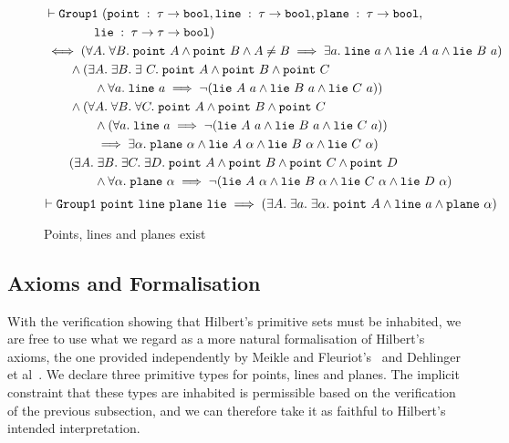 \begin{figure}
  \begin{align*}
    &\vdash\code{Group1}\ (\code{point}\;:\;\tau\rightarrow\code{bool}, \code{line}\;:\;\tau\rightarrow\code{bool},\code{plane}\;:\;\tau\rightarrow\code{bool},\\
    &\qquad\qquad\code{lie}\;:\;\tau\rightarrow\tau\rightarrow\code{bool})\\
    &\iff (\forall A.\;\forall B.\; \code{point}\ A \wedge \code{point}\ B \wedge A \neq B \implies \exists a.\; \code{line}\ a \wedge \code{lie}\ A\ a \wedge \code{lie}\ B\ a)\\
    &\qquad\wedge (\exists A.\;\exists B.\;\exists\ C.\; \code{point}\ A \wedge \code{point}\ B \wedge \code{point}\ C\\
    &\qquad\qquad\wedge \forall a.\; \code{line}\ a \implies \neg(\code{lie}\ A\ a \wedge \code{lie}\ B\ a \wedge \code{lie}\ C\ a))\\
    &\qquad\wedge(\forall A.\;\forall B.\;\forall C.\; \code{point}\ A \wedge \code{point}\ B \wedge \code{point}\ C\\
    &\qquad\qquad\wedge (\forall a.\; \code{line}\ a \implies \neg(\code{lie}\ A\ a \wedge \code{lie}\ B\ a \wedge \code{lie}\ C\ a))\\
    &\qquad\qquad\implies\exists\alpha.\; \code{plane}\ \alpha \wedge \code{lie}\ A\ \alpha \wedge \code{lie}\ B\ \alpha \wedge \code{lie}\ C\ \alpha)\\
    &\qquad (\exists A.\;\exists B.\;\exists C.\;\exists D.\; \code{point}\ A \wedge \code{point}\ B \wedge \code{point}\ C \wedge \code{point}\ D\\
    &\qquad\qquad \wedge \forall \alpha.\; \code{plane}\ \alpha \implies \neg(\code{lie}\ A\ \alpha \wedge \code{lie}\ B\ \alpha \wedge \code{lie}\ C\ \alpha \wedge \code{lie}\ D\ \alpha)\\
  \end{align*}
  \begin{displaymath}
    \vdash \texttt{Group1}\ \texttt{point}\ \texttt{line}\ \texttt{plane}\ \texttt{lie} \implies (\exists A.\;\exists a.\;\exists \alpha.\; \texttt{point}\ A \wedge \texttt{line}\ a \wedge \texttt{plane}\ \alpha)
  \end{displaymath}
\caption{Points, lines and planes exist}
\label{fig:InhabitedTypes}
\end{figure}

\subsection{Axioms and Formalisation}
With the verification showing that Hilbert's primitive sets must be inhabited, we are free to use what we regard as a more natural formalisation of Hilbert's axioms, the one provided independently by Meikle and Fleuriot's~\cite{MeikleFleuriotFormalizingHilbert} and Dehlinger et al~\cite{DehlingerFOG}. We declare three primitive types for points, lines and planes. The implicit constraint that these types are inhabited is permissible based on the verification of the previous subsection, and we can therefore take it as faithful to Hilbert's intended interpretation.

